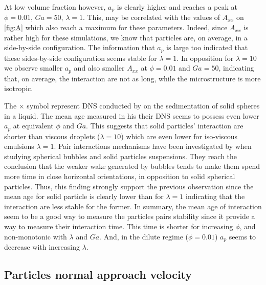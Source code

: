 At low volume fraction however, $a_p$ is clearly higher and reaches a peak at $\phi=0.01$, $Ga=50$, $\lambda=1$.
This, may be correlated with the values of $A_{xx}$ on \ref{fig:A} which also reach a maximum for these parameters. 
Indeed, since $A_{xx}$ is rather high for these simulations, we know that particles are, on average, in a side-by-side configuration.
The information that $a_p$ is large too indicated that these sides-by-side configuration seems stable for $\lambda = 1$. 
In opposition for $\lambda = 10$ we observe smaller $a_p$ and also smaller $A_{xx}$ at $\phi = 0.01$ and $Ga = 50$, indicating that, on average, the interaction are not as long, while the microstructure is more isotropic. 

The $\pmb\times$ symbol represent DNS conducted by \citet{zhang2023evolution} on the sedimentation of solid spheres in a liquid. 
The mean age measured in his their DNS seems to possess even lower $a_p$ at equivalent $\phi$ and $Ga$. 
This suggests that solid particles' interaction are shorter than viscous droplets ($\lambda = 10$) which are even lower for iso-viscous emulsions $\lambda = 1$. 
Pair interactions mechanisms have been investigated by \citet{yin2008lattice} when studying spherical bubbles and solid particles suspensions.
They reach the conclusion that the weaker wake generated by bubbles tends to make them spend more time in close horizontal orientations, in opposition to solid spherical particles. 
Thus, this finding strongly support the previous observation since the mean age for solid particle is clearly lower than for $\lambda = 1$ indicating that the interaction are less stable for the former. 
In summary, the mean age of interaction seem to be a good way to measure the particles pairs stability since it provide a way to measure their interaction time. 
This time is shorter for increasing $\phi$, and non-monotonic with $\lambda$ and $Ga$. 
And, in the dilute regime ($\phi = 0.01$) $a_p$ seems to decrease with increasing $\lambda$. 






\subsection{Particles normal approach velocity}


